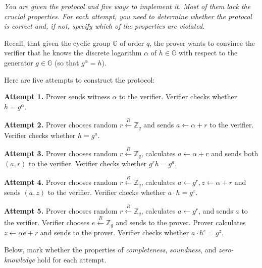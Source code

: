 \documentclass[../lecture-notes-148x210.tex]{subfiles}
\begin{document}
\begin{tcolorbox}[breakable, colback=gray!10!white,fonttitle=\bfseries,colframe=purple!80!black,title=Exercises 1-5. In search of correct Schnorr's Identification Protocol\ldots]
    \textit{You are given the protocol and five ways to implement it. Most of them lack the crucial properties. For each attempt, you need to determine whether the protocol is correct and, if not, specify which of the properties are violated.}
    \vspace{2px}
 
    Recall, that given the cyclic group $\mathbb{G}$ of order $q$, the prover wants to convince the verifier that he knows the discrete logarithm $\alpha$ of $h \in \mathbb{G}$ with respect to the generator $g \in \mathbb{G}$ (so that $g^{\alpha}=h$).

    Here are five attempts to construct the protocol:

    \textcolor{purple!80!black}{\textbf{Attempt 1.}} Prover sends witness $\alpha$ to the verifier. Verifier checks whether $h = g^{\alpha}$.

    \textcolor{purple!80!black}{\textbf{Attempt 2.}} Prover chooses random $r \xleftarrow{R} \mathbb{Z}_q$ and sends $a \gets \alpha + r$ to the verifier. Verifier checks whether $h = g^a$.

    \textcolor{purple!80!black}{\textbf{Attempt 3.}} Prover chooses random $r \xleftarrow{R} \mathbb{Z}_q$, calculates $a \gets \alpha + r$ and sends both $(a,r)$ to the verifier. Verifier checks whether $g^r h = g^a$.

    \textcolor{purple!80!black}{\textbf{Attempt 4.}} Prover chooses random $r \xleftarrow{R} \mathbb{Z}_q$, calculates $a \gets g^r, z \gets \alpha+r$ and sends $(a,z)$ to the verifier. Verifier checks whether $a \cdot h = g^z$.

    \textcolor{purple!80!black}{\textbf{Attempt 5.}} Prover chooses random $r \xleftarrow{R} \mathbb{Z}_q$, calculates $a \gets g^r$, and sends $a$ to the verifier. Verifier chooses $e \xleftarrow{R} \mathbb{Z}_q$ and sends to the prover. Prover calculates $z \gets \alpha e + r$ and sends to the prover. Verifier checks whether $a \cdot h^e = g^z$.

    \vspace{2px}

    Below, mark whether the properties of \textit{completeness}, \textit{soundness}, and \textit{zero-knowledge} hold for each attempt.

    \vspace{-1mm}


\end{tcolorbox}
\end{document}
